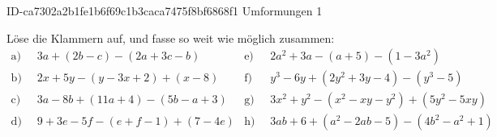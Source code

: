 \begin{exercise}
      {ID-ca7302a2b1fe1b6f69c1b3caca7475f8bf6868f1}
      {Umformungen 1}
  \newcommand{\gap}{\;\;}%
  \ifproblem\problem\par
    Löse die Klammern auf, und fasse so weit wie möglich zusammen:
    \begin{align*}
      \text{a)}\gap & 3a+(2b-c)-(2a+3c-b) &
      \text{e)}\gap & 2a^2+3a-(a+5)-(1-3a^2)
      \\
      \text{b)}\gap & 2x+5y-(y-3x+2)+(x-8) &
      \text{f)}\gap & y^3-6y+(2y^2+3y-4)-(y^3-5)
      \\
      \text{c)}\gap & 3a-8b+(11a+4)-(5b-a+3) &
      \text{g)}\gap & 3x^2+y^2-(x^2-xy-y^2)+(5y^2-5xy)
      \\
      \text{d)}\gap & 9+3e-5f-(e+f-1)+(7-4e) &
      \text{h)}\gap & 3ab+6+(a^2-2ab-5)-(4b^2-a^2+1)
    \end{align*}
  \fi
  \ifoutcome\outcome
    \newcommand{\toprow}[1]
    {%
      \makebox[20em][l]
      {%
        \ensuremath
        {%
          \displaystyle
          \phantom{\,=\:\,}%
          #1%
        }%
      }%
    }%
    \newcommand{\solutionA}
    {%
      \begin{equation*}
        \begin{split}
          \text{a)} &\toprow{3a+(2b-c)-(2a+3c-b)} \\
                    &=       3a+2b-c-2a-3c+b      \\
                    &=       a+3b-4c
        \end{split}
      \end{equation*}
    }%
    \newcommand{\solutionB}
    {%
      \begin{equation*}
        \begin{split}
          \text{b)} &\toprow{2x+5y-(y-3x+2)+(x-8)} \\
                    &=       2x+5y-y+3x-2+x-8      \\
                    &=       6x+4y-10
        \end{split}
      \end{equation*}
    }%
    \newcommand{\solutionC}
    {%
      \begin{equation*}
        \begin{split}
          \text{c)} &\toprow{3a-8b+(11a+4)-(5b-a+3)} \\

\end{split}
\end{equation*}}
\end{exercise}
